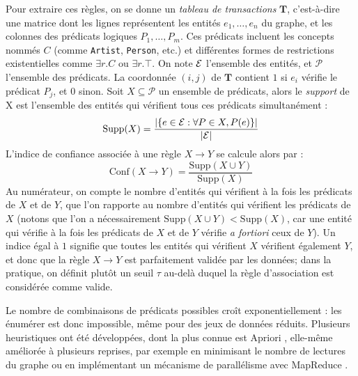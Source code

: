 Pour extraire ces règles, on se donne un \textit{tableau de transactions} $\textbf{T}$, c'est-à-dire une matrice dont les lignes représentent les entités $e_1, \ldots, e_n$ du graphe, et les colonnes des prédicats logiques $P_1, \ldots, P_m$. Ces prédicats incluent les concepts nommés $C$ (comme \texttt{Artist}, \texttt{Person}, etc.) et différentes formes de restrictions existentielles comme $\exists r.C$ ou  $\exists r.\top$. On note $\mathcal{E}$ l'ensemble des entités, et $\mathcal{P}$ l'ensemble des prédicats. 
La coordonnée $(i, j)$ de $\textbf{T}$ contient $1$ si $e_i$ vérifie le prédicat $P_j$, et $0$ sinon. Soit $X \subseteq \mathcal{P}$ un ensemble de prédicats, alors le \textit{support} de X est l'ensemble des entités qui vérifient tous ces prédicats simultanément :
\begin{equation}
    \textrm{Supp}(X) = \frac{|\{ e \in \mathcal{E} : \forall P \in X, P(e) \}|}{|\mathcal{E} |}
\end{equation}
L'indice de confiance associée à une règle $X \rightarrow Y$ se calcule alors par :
\begin{equation}
    \textrm{Conf}(X \rightarrow Y) = \frac{\textrm{Supp}(X \cup Y)}{\textrm{Supp}(X)}
\end{equation}
Au numérateur, on compte le nombre d'entités qui vérifient à la fois les prédicats de $X$ et de $Y$, que l'on rapporte au nombre d'entités qui vérifient les prédicats de $X$ (notons que l'on a nécessairement $\textrm{Supp}(X \cup Y) < \textrm{Supp}(X)$, car une entité qui vérifie à la fois les prédicats de $X$ et de $Y$ vérifie \textit{a fortiori} ceux de $Y$). Un indice égal à $1$ signifie que toutes les entités qui vérifient $X$ vérifient également $Y$, et donc que la règle $X \rightarrow Y$ est parfaitement validée par les données; dans la pratique, on définit plutôt un seuil $\tau$ au-delà duquel la règle d'association est considérée comme valide.

Le nombre de combinaisons de prédicats possibles croît exponentiellement : les énumérer est donc impossible, même pour des jeux de données réduits. Plusieurs heuristiques ont été développées, dont la plus connue est Apriori \cite{srikant1994apriori}, elle-même améliorée à plusieurs reprises, par exemple en minimisant le nombre de lectures du graphe \cite{yuan2017improved} ou en implémentant un mécanisme de parallélisme avec MapReduce \cite{lin2014mapreduce}. %

